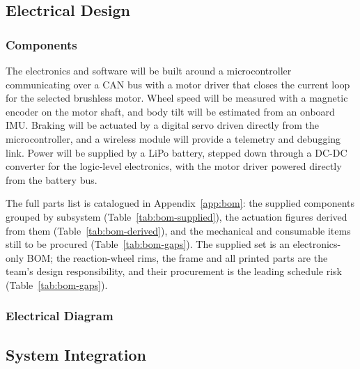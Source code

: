 \subsection{Electrical Design}
\label{sec:electrical}

\subsubsection{Components}

The electronics and software will be built around a microcontroller communicating over a CAN bus with a motor driver that closes the current loop for the selected brushless motor. Wheel speed will be measured with a magnetic encoder on the motor shaft, and body tilt will be estimated from an onboard IMU. Braking will be actuated by a digital servo driven directly from the microcontroller, and a wireless module will provide a telemetry and debugging link. Power will be supplied by a LiPo battery, stepped down through a DC-DC converter for the logic-level electronics, with the motor driver powered directly from the battery bus.

The full parts list is catalogued in Appendix~\ref{app:bom}: the supplied
components grouped by subsystem (Table~\ref{tab:bom-supplied}), the actuation
figures derived from them (Table~\ref{tab:bom-derived}), and the mechanical and
consumable items still to be procured (Table~\ref{tab:bom-gaps}). The supplied
set is an electronics-only BOM; the reaction-wheel rims, the frame and all
printed parts are the team's design responsibility, and their procurement is the
leading schedule risk (Table~\ref{tab:bom-gaps}).

\subsubsection{Electrical Diagram}


\subsection{System Integration}
\label{sec:integration}

